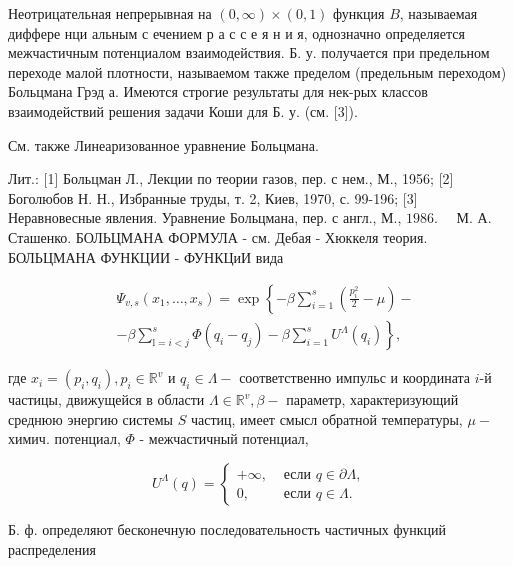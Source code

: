 \documentclass[10pt]{article}
\begin{document}
Неотрицательная непрерывная на $(0, \infty) \times(0,1)$ функция $B$, называемая диффере нци альным с ечением р а с с е я н и я, однозначно определяется межчастичным потенциалом взаимодействия. Б. у. получается при предельном переходе малой плотности, называемом также пределом (предельным переходом) Больцмана Грэд а. Имеются строгие результаты для нек-рых классов взаимодействий решения задачи Коши для Б. у. (см. [3]).



См. также Линеаризованное уравнение Больцмана.



Лит.: [1] Больцман Л., Лекции по теории газов, пер. с нем., М., 1956; [2] Боголюбов Н. Н., Избранные труды, т. 2, Киев, 1970, с. 99-196; [3] Неравновесные явления. Уравнение Больцмана, пер. с англ., М., $1986 . \quad$ М. А. Сташенко. БОЛЬЦМАНА ФОРМУЛА - см. Дебая - Хюккеля теория. БОЛЬЦМАНА ФУНКЦИИ - ФУНКЦиИ вида



\[

\begin{aligned}

& \Psi_{v, s}\left(x_{1}, \ldots, x_{s}\right)=\exp \left\{-\beta \sum_{i=1}^{s}\left(\frac{p_{i}^{2}}{2}-\mu\right)-\right. \\

& \left.-\beta \sum_{\mathrm{l}=i<j}^{s} \Phi\left(q_{i}-q_{j}\right)-\beta \sum_{i=1}^{s} U^{\Lambda}\left(q_{i}\right)\right\},

\end{aligned}

\]



где $x_{i}=\left(p_{i}, q_{i}\right), p_{i} \in \mathbb{R}^{v}$ и $q_{i} \in \Lambda-$ соответственно импульс и координата $i$-й частицы, движущейся в области $\Lambda \in \mathbb{R}^{v}, \beta-$ параметр, характеризующий среднюю энергию системы $S$ частиц, имеет смысл обратной температуры, $\mu-$ химич. потенциал, $\Phi$ - межчастичный потенциал,



\[

U^{\Lambda}(q)= \begin{cases}+\infty, & \text { если } q \in \partial \Lambda, \\ 0, & \text { если } q \in \Lambda .\end{cases}

\]



Б. ф. определяют бесконечную последовательность частичных функций распределения
\end{document}
